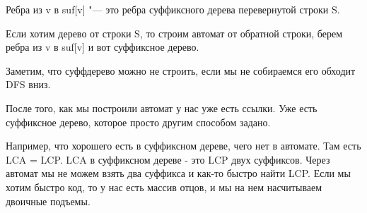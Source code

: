     \begin{theorem}
    Ребра из v в suf[v] "--- это ребра суффиксного дерева перевернутой 
    строки S.
    \end{theorem}

    Если хотим дерево от строки S, то строим автомат 
    от обратной строки, берем ребра из v в suf[v] и 
    вот суффиксное дерево. 

    Заметим, что суффдерево можно не строить, если мы не собираемся его обходит DFS вниз. 

    После того, как мы построили автомат у нас уже есть ссылки. Уже есть
    суффиксное дерево, которое просто другим способом задано.    
    
    Например, что хорошего есть в суффиксном дереве, чего нет 
    в автомате. Там есть LCA = LCP. LCA в суффиксном дереве - это
    LCP двух суффиксов. Через автомат мы не можем
    взять два суффикса и как-то быстро найти LCP. Если мы хотим
    быстро код, то у нас есть массив отцов, и мы на нем насчитываем
    двоичные подъемы.

    
